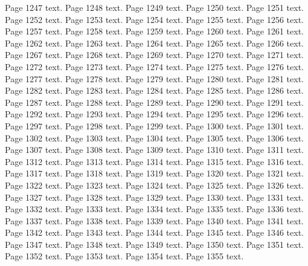 \documentclass{article}
\begin{document}
Page 1247 text.\newpage
Page 1248 text.\newpage
Page 1249 text.\newpage
Page 1250 text.\newpage
Page 1251 text.\newpage
Page 1252 text.\newpage
Page 1253 text.\newpage
Page 1254 text.\newpage
Page 1255 text.\newpage
Page 1256 text.\newpage
Page 1257 text.\newpage
Page 1258 text.\newpage
Page 1259 text.\newpage
Page 1260 text.\newpage
Page 1261 text.\newpage
Page 1262 text.\newpage
Page 1263 text.\newpage
Page 1264 text.\newpage
Page 1265 text.\newpage
Page 1266 text.\newpage
Page 1267 text.\newpage
Page 1268 text.\newpage
Page 1269 text.\newpage
Page 1270 text.\newpage
Page 1271 text.\newpage
Page 1272 text.\newpage
Page 1273 text.\newpage
Page 1274 text.\newpage
Page 1275 text.\newpage
Page 1276 text.\newpage
Page 1277 text.\newpage
Page 1278 text.\newpage
Page 1279 text.\newpage
Page 1280 text.\newpage
Page 1281 text.\newpage
Page 1282 text.\newpage
Page 1283 text.\newpage
Page 1284 text.\newpage
Page 1285 text.\newpage
Page 1286 text.\newpage
Page 1287 text.\newpage
Page 1288 text.\newpage
Page 1289 text.\newpage
Page 1290 text.\newpage
Page 1291 text.\newpage
Page 1292 text.\newpage
Page 1293 text.\newpage
Page 1294 text.\newpage
Page 1295 text.\newpage
Page 1296 text.\newpage
Page 1297 text.\newpage
Page 1298 text.\newpage
Page 1299 text.\newpage
Page 1300 text.\newpage
Page 1301 text.\newpage
Page 1302 text.\newpage
Page 1303 text.\newpage
Page 1304 text.\newpage
Page 1305 text.\newpage
Page 1306 text.\newpage
Page 1307 text.\newpage
Page 1308 text.\newpage
Page 1309 text.\newpage
Page 1310 text.\newpage
Page 1311 text.\newpage
Page 1312 text.\newpage
Page 1313 text.\newpage
Page 1314 text.\newpage
Page 1315 text.\newpage
Page 1316 text.\newpage
Page 1317 text.\newpage
Page 1318 text.\newpage
Page 1319 text.\newpage
Page 1320 text.\newpage
Page 1321 text.\newpage
Page 1322 text.\newpage
Page 1323 text.\newpage
Page 1324 text.\newpage
Page 1325 text.\newpage
Page 1326 text.\newpage
Page 1327 text.\newpage
Page 1328 text.\newpage
Page 1329 text.\newpage
Page 1330 text.\newpage
Page 1331 text.\newpage
Page 1332 text.\newpage
Page 1333 text.\newpage
Page 1334 text.\newpage
Page 1335 text.\newpage
Page 1336 text.\newpage
Page 1337 text.\newpage
Page 1338 text.\newpage
Page 1339 text.\newpage
Page 1340 text.\newpage
Page 1341 text.\newpage
Page 1342 text.\newpage
Page 1343 text.\newpage
Page 1344 text.\newpage
Page 1345 text.\newpage
Page 1346 text.\newpage
Page 1347 text.\newpage
Page 1348 text.\newpage
Page 1349 text.\newpage
Page 1350 text.\newpage
Page 1351 text.\newpage
Page 1352 text.\newpage
Page 1353 text.\newpage
Page 1354 text.\newpage
Page 1355 text.\newpage
\end{document}
